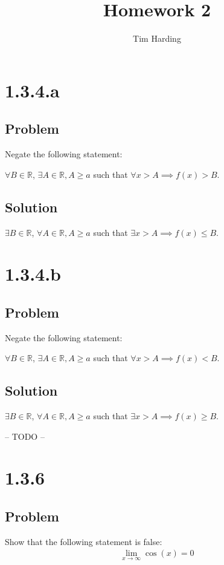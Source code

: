 \documentclass[12pt]{article}
\title{Homework 2}
\author{Tim Harding}
\begin{document}
\maketitle

\section*{1.3.4.a}

\subsection*{Problem}
Negate the following statement:

$\forall B \in \mathbb{R}$, $\exists A \in \mathbb{R}, A \geq a$ such that $\forall x > A \implies f(x) > B$.

\subsection*{Solution}
$\exists B \in \mathbb{R}$, $\forall A \in \mathbb{R}, A \geq a$ such that $\exists x > A \implies f(x) \leq B$.



\section*{1.3.4.b}

\subsection*{Problem}
Negate the following statement:

$\forall B \in \mathbb{R}$, $\exists A \in \mathbb{R}, A \geq a$ such that $\forall x > A \implies f(x) < B$.

\subsection*{Solution}
$\exists B \in \mathbb{R}$, $\forall A \in \mathbb{R}, A \geq a$ such that $\exists x > A \implies f(x) \geq B$.



-- TODO --
\section*{1.3.6}

\subsection*{Problem}
Show that the following statement is false:
\begin{align*}
    \lim_{x \to \infty} \cos(x) = 0
\end{align*}
\end{document}
